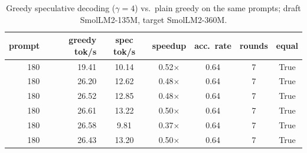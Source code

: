 \begin{table}[t]
\centering
\caption{Greedy speculative decoding ($\gamma=4$) vs.\ plain greedy on the
same prompts; draft SmolLM2-135M, target SmolLM2-360M.}
\label{tab:spec}
\begin{tabular}{rrccccc}
\toprule
prompt & greedy tok/s & spec tok/s & speedup & acc.\ rate & rounds & equal \\
\midrule
180 & 19.41 & 10.14 & 0.52$\times$ & 0.64 & 7 & True \\
180 & 26.20 & 12.62 & 0.48$\times$ & 0.64 & 7 & True \\
180 & 26.52 & 12.85 & 0.48$\times$ & 0.64 & 7 & True \\
180 & 26.61 & 13.22 & 0.50$\times$ & 0.64 & 7 & True \\
180 & 26.58 & 9.81 & 0.37$\times$ & 0.64 & 7 & True \\
180 & 26.43 & 13.20 & 0.50$\times$ & 0.64 & 7 & True \\
\bottomrule
\end{tabular}
\end{table}
